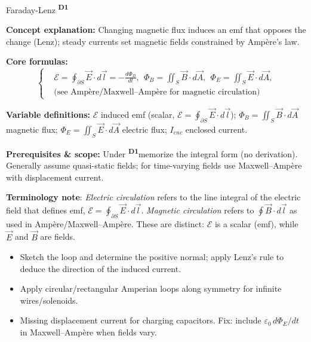 ﻿\documentclass[12pt,a4paper]{article}
\providecommand{\KPFormulas}{}
\providecommand{\KPHeuristics}{}
\newcommand{\DOne}{\texorpdfstring{\textsuperscript{\textbf{D1}}}{ D1}}
\begin{document}
\begin{KnowledgePoint}{Faraday-Lenz \DOne}
  \KPFormulas
\begin{formulabox}
  \textbf{Concept explanation:} Changing magnetic flux induces an emf that opposes the change (Lenz); steady currents set magnetic fields constrained by Amp\`ere's law.

  \textbf{Core formulas:}
  \[
  \left\{\begin{aligned}
    &\mathcal E=\oint_{\partial S}\vec E\cdot d\vec l=-\frac{d\Phi_B}{dt},\ \ \Phi_B=\iint_S \vec B\cdot d\vec A,\ \ \Phi_E=\iint_S \vec E\cdot d\vec A,\\
    &\text{(see Amp\`ere/Maxwell--Amp\`ere for magnetic circulation)}
  \end{aligned}\right.
  \]

  \textbf{Variable definitions:} $\mathcal E$ induced emf (scalar, $\mathcal E=\oint_{\partial S}\vec E\cdot d\vec l$); $\Phi_B=\iint_S \vec B\cdot d\vec A$ magnetic flux; $\Phi_E=\iint_S \vec E\cdot d\vec A$ electric flux; $I_{enc}$ enclosed current.
  
  \textbf{Prerequisites \& scope:} Under \DOne memorize the integral form (no derivation). Generally assume quasi-static fields; for time-varying fields use Maxwell--Amp\`ere with displacement current.
  \end{formulabox}

  \begin{insightbox}
  \textbf{Terminology note}: \emph{Electric circulation} refers to the line integral of the electric field that defines emf, $\mathcal E=\oint_{\partial S}\vec E\cdot d\vec l$. \emph{Magnetic circulation} refers to $\oint\vec B\cdot d\vec l$ as used in Amp\`ere/Maxwell--Amp\`ere. These are distinct: $\mathcal E$ is a scalar (emf), while $\vec E$ and $\vec B$ are fields.
  \end{insightbox}

  \KPHeuristics
  \begin{heuristicsbox}
  \begin{itemize}[leftmargin=*]
    \item Sketch the loop and determine the positive normal; apply Lenz's rule to deduce the direction of the induced current.
    \item Apply circular/rectangular Amperian loops along symmetry for infinite wires/solenoids.
  \end{itemize}
  \vspace{0.4em}
  \begin{itemize}[leftmargin=*]
    \item Missing displacement current for charging capacitors. Fix: include $\varepsilon_0\,d\Phi_E/dt$ in Maxwell–Amp\`ere when fields vary.
  \end{itemize}
  \end{heuristicsbox}


\end{KnowledgePoint}
\end{document}
